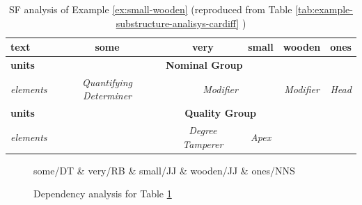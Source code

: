 \begin{table}[ht]
	\centering
	\begin{tabular}{|l|c|c|ccc}
		\hline
		\textbf{text}              & \textbf{some}                            & \textbf{very}                     & \multicolumn{1}{c|}{\textbf{small}} & \multicolumn{1}{c|}{\textbf{wooden}}            & \multicolumn{1}{c|}{\textbf{ones}}          \\ \hline
		\textbf{units}    & \multicolumn{5}{c|}{\textbf{Nominal Group}}                                                                                                                           \\ \hline
		\textit{elements} & \textit{Quantifying Determiner} & \multicolumn{2}{c|}{\textit{Modifier}}                & \multicolumn{1}{c|}{\textit{Modifier}} & \multicolumn{1}{c|}{\textit{Head}} \\ \hline
		\textbf{units}    &                                 & \multicolumn{2}{c|}{\textbf{Quality Group}}           & \multicolumn{2}{c}{\multirow{2}{*}{}}                                       \\ \cline{1-1} \cline{3-4}
		\textit{elements} &                                 & \textit{Degree Tamperer} & \textit{Apex}              & \multicolumn{2}{c}{}                   \\ \cline{1-1} \cline{3-4}
	\end{tabular}
	
	
	\caption{SF analysis of Example \ref{ex:small-wooden} (reproduced from Table \ref{tab:example-substructure-analisys-cardiff} )}
	\label{tab:example-substructure-analisys-cardiff-repeated}
\end{table}

\begin{figure}[ht]
	\centering
	\begin{dependency}
		\begin{deptext}[]
			some/DT \& very/RB \& small/JJ \& wooden/JJ \& ones/NNS \\
		\end{deptext}
	\end{dependency}
	\caption{Dependency analysis for Table \ref{tab:example-substructure-analisys-cardiff-repeated} }
	\label{fig:small-wooden-dependecy}
\end{figure}



